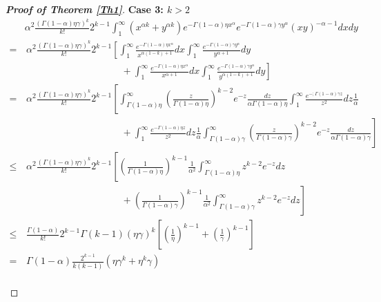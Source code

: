 \documentclass[11pt, reqno]{amsart}
\numberwithin{equation}{section}
\theoremstyle{plain} %
\theoremstyle{definition} %
\begin{document}
\begin{proof}[{\bf Proof of Theorem \ref{Th1}}]
{\bf Case 3: $k>2$}        
     \begin{align*}
& \alpha^2   \frac{\left(   \Gamma(1-\alpha) \eta\gamma \right)^k}{k!} 2^{k-1} \int^{\infty}_{1}   \left( x^{\alpha k} + y^{\alpha k}  \right)      e^{-    \Gamma(1-\alpha) \eta x^{\alpha}} e^{-   \Gamma(1-\alpha) \gamma y^{\alpha}}  (xy)^{-\alpha -1} dx dy\\
    =&  \,\alpha^2   \frac{\left(   \Gamma(1-\alpha) \eta\gamma \right)^k}{k!} 2^{k-1}   \left[     \int^{\infty}_{1} \frac{e^{-  \Gamma(1-\alpha) \eta x^{\alpha} }}{x^{\alpha(1-k)+1}} dx  \int^{\infty}_{1} \frac{e^{-   \Gamma(1-\alpha) \gamma y^{\alpha} }}{y^{\alpha + 1}} dy \right. \\
    &  \left. \qquad \qquad \qquad \quad \quad \quad \quad + \int^{\infty}_{1} \frac{e^{-  \Gamma(1-\alpha) \eta x^{\alpha} }}{x^{\alpha + 1}} dx    \int^{\infty}_{1} \frac{e^{-  \Gamma(1-\alpha) \gamma y^{\alpha} }}{y^{\alpha(1-k)+1}} dy  \right] \\
     =& \,  \alpha  ^2   \frac{\left(    \Gamma(1-\alpha) \eta\gamma \right)^k}{k!} 2^{k-1}   \left[     \int^{\infty}_{ \Gamma(1-\alpha)  \eta } \left(\frac{z}{\Gamma(1-\alpha) \eta } \right)^{k-2} e^{- z }\frac{dz}{\alpha  \Gamma(1-\alpha)   \eta}  \int^{\infty}_{1} \frac{e^{- ;  \Gamma(1-\alpha) \gamma z }}{z^2} dz \frac{1}{\alpha}\right. \\
    &  \left. \qquad \qquad \qquad \quad \quad \quad \quad + \int^{\infty}_{1} \frac{e^{-  \Gamma(1-\alpha) \eta z }}{z^2} dz \frac{1}{\alpha}    \int^{\infty}_{\Gamma(1-\alpha)   \gamma } \left(\frac{z}{ \Gamma(1-\alpha) \gamma } \right)^{k-2} e^{- z }\frac{dz}{\alpha \Gamma(1-\alpha)  \gamma}   \right] \\
    \leq &\, \alpha ^2   \frac{\left(    \Gamma(1-\alpha) \eta\gamma \right)^k}{k!} 2^{k-1}   \left[ \left(\frac{1}{\Gamma(1-\alpha) \eta } \right)^{k-1} \frac{1}{\alpha^2}  \int^{\infty}_{ \Gamma(1-\alpha) \eta } z^{k-2} e^{- z } dz   \right. \\
    &  \left. \qquad \qquad \qquad \quad \quad \quad \quad +   \left(\frac{1}{ \Gamma(1-\alpha) \gamma } \right)^{k-1} \frac{1}{\alpha^2}    \int^{\infty}_{ \Gamma(1-\alpha) \gamma } z^{k-2} e^{- z }dz   \right] \\
     \leq &\,    \frac{    \Gamma(1-\alpha)}{k!} 2^{k-1}    \Gamma(k-1) \left(\eta\gamma \right)^k \left[ \left(\frac{1}{ \eta } \right)^{k-1}      +   \left(\frac{1}{\gamma } \right)^{k-1}        \right] \\
     = & \,   \Gamma(1-\alpha) \frac{2^{k-1} }{k(k-1)}  \left( \eta \gamma^k       +   \eta^k \gamma        \right) 
\end{align*}\\



\end{proof}
\end{document}

